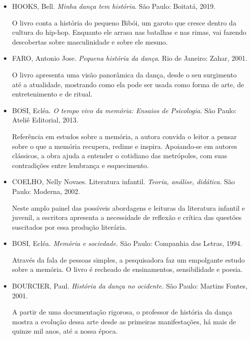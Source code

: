 \documentclass[12pt]{extarticle}
\begin{document}
\begin{itemize}


\item \textsc{HOOKS}, Bell. \emph{Minha dança tem história}. São Paulo:
  Boitatá, 2019.

O livro conta a história do pequeno Bibói, um garoto que cresce dentro
  da cultura do hip-hop. Enquanto ele arrasa nas batalhas e nas rimas, vai
  fazendo descobertas sobre masculinidade e sobre ele mesmo.

\item \textsc{FARO}, Antonio Jose. \emph{Pequena história da dança}. Rio de Janeiro: Zahar,
  2001.

O livro apresenta uma visão panorâmica da dança, desde o seu surgimento
  até a atualidade, mostrando como ela pode ser usada como forma de arte, de
  entretenimento e de ritual.

\item \textsc{BOSI}, Ecléa. \emph{O tempo vivo da memória: Ensaios de Psicologia}. São Paulo:
  Ateliê Editorial, 2013.

Referência em estudos sobre a memória, a autora convida o leitor a
  pensar sobre o que a memória recupera, redime e inspira. Apoiando-se em
  autores clássicos, a obra ajuda a entender o cotidiano das metrópoles, com
  suas contradições entre lembrança e esquecimento. 

\item  
\textsc{COELHO}, Nelly Novaes. Literatura infantil. \emph{Teoria,
análise, didática}. São Paulo: Moderna, 2002.

Neste amplo painel das possíveis abordagens e leituras da literatura
infantil e juvenil, a escritora apresenta a necessidade de reflexão e crítica
das questões suscitados por essa produção literária.

\item
\textsc{BOSI}, Ecléa. \emph{Memória e sociedade.} São Paulo: Companhia
das Letras, 1994.

Através da fala de pessoas simples, a pesquisadora faz um empolgante
estudo sobre a memória. O livro é recheado de ensinamentos, sensibilidade e
poesia.

\item
\textsc{BOURCIER}, Paul. \emph{História da dança no ocidente.} São Paulo:
Martins Fontes, 2001. 

A partir de uma documentação rigorosa, o professor de história da dança
mostra a evolução dessa arte desde as primeiras manifestações, há mais de
quinze mil anos, até a nossa época.

\end{itemize}
\end{document}
